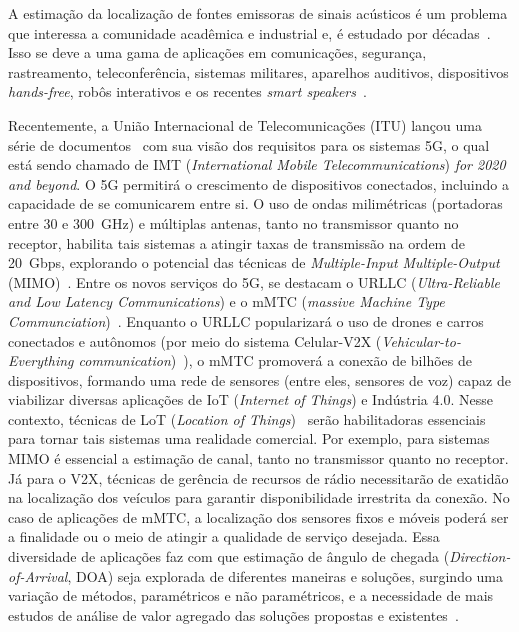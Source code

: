 \documentclass{sbrt2017port}
\begin{document}
A estimação da localização de fontes emissoras de sinais acústicos é um problema que interessa a comunidade acadêmica e industrial e, é estudado por décadas~\cite{Benesty2007OnPerspective}. Isso se deve a uma gama de aplicações em comunicações, segurança, rastreamento, teleconferência, sistemas militares, aparelhos auditivos, dispositivos \textit{hands-free}, robôs interativos e os recentes \textit{smart speakers}~\cite{Busso2005SmartIdentification,Yu2010SmartIssues,Kowalczyk2015ParametricProcessing,Astapov2015GunshotArrays,Kowalczyk2016EmbeddedSignals}.  

Recentemente, a União Internacional de Telecomunicações (ITU) lançou uma série de documentos~\cite{itu_M_2383_2015} com sua visão dos requisitos para os sistemas 5G, o qual está sendo chamado de IMT (\textit{International Mobile Telecommunications}) \textit{for 2020 and beyond}. O 5G permitirá o crescimento de dispositivos conectados, incluindo a capacidade de se comunicarem entre si. O uso de ondas milimétricas (portadoras entre 30 e 300~GHz) e múltiplas antenas, tanto no transmissor quanto no receptor, habilita tais sistemas a atingir taxas de transmissão na ordem de 20~Gbps, explorando o potencial das técnicas de \textit{Multiple-Input Multiple-Output} (MIMO)~\cite{Wang2015Two-DimensionSystems, Larsson2014MassiveSystems, Andrews2014WhatBe}. Entre os novos serviços do 5G, se destacam o URLLC (\textit{Ultra-Reliable and Low Latency Communications}) e o mMTC (\textit{massive Machine Type Communciation})~\cite{itu_M_2383_2015}. Enquanto o URLLC popularizará o uso de drones e carros conectados e autônomos (por meio do sistema Celular-V2X (\textit{Vehicular-to-Everything communication})~\cite{v2x_5Gamericas}), o mMTC promoverá a conexão de bilhões de dispositivos, formando uma rede de sensores (entre eles, sensores de voz) capaz de viabilizar diversas aplicações de IoT (\textit{Internet of Things}) e Indústria 4.0. Nesse contexto, técnicas de LoT (\textit{Location of Things})~\cite{LoT_survey} serão habilitadoras essenciais para tornar tais sistemas uma realidade comercial. Por exemplo, para sistemas MIMO é essencial a estimação de canal, tanto no transmissor quanto no receptor. Já para o V2X, técnicas de gerência de recursos de rádio necessitarão de exatidão na localização dos veículos para garantir disponibilidade irrestrita da conexão. No caso de aplicações de mMTC, a localização dos sensores fixos e móveis poderá ser a finalidade ou o meio de atingir a qualidade de serviço desejada. Essa diversidade de aplicações faz com que estimação de ângulo de chegada (\emph{Direction-of-Arrival}, DOA) seja explorada de diferentes maneiras e soluções, surgindo uma variação de métodos, paramétricos e não paramétricos, e a necessidade de mais estudos de análise de valor agregado das soluções propostas e existentes~\cite{Kowalczyk2015ParametricProcessing,Qin2015DoaDependency}.
\end{document}
